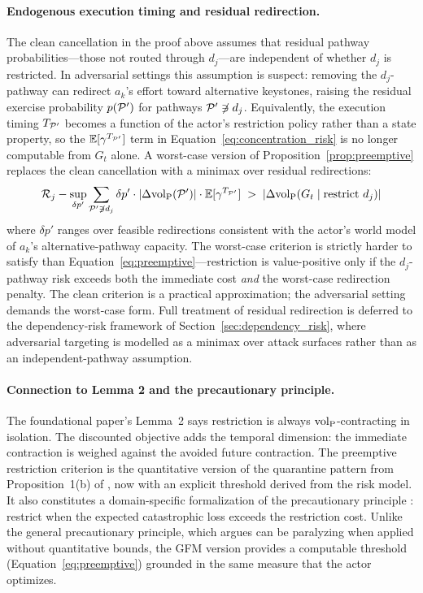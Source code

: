 \paragraph{Endogenous execution timing and residual redirection.} The
clean cancellation in the proof above assumes that residual pathway
probabilities---those not routed through $d_j$---are independent of
whether $d_j$ is restricted. In adversarial settings this assumption is
suspect: removing the $d_j$-pathway can redirect $a_k$'s effort toward
alternative keystones, raising the residual exercise probability
$p(\mathcal{P}')$ for pathways $\mathcal{P}' \not\ni d_j$. Equivalently, the
execution timing $T_{\mathcal{P}'}$ becomes a function of the actor's
restriction policy rather than a state property, so the
$\mathbb{E}[\gamma^{T_{\mathcal{P}'}}]$ term in
Equation~\eqref{eq:concentration_risk} is no longer computable from
$G_t$ alone. A worst-case version of
Proposition~\ref{prop:preemptive} replaces
the clean cancellation with a minimax over residual redirections:
\begin{equation}
\label{eq:preemptive_worst_case}
\mathcal{R}_j - \sup_{\delta p'} \sum_{\mathcal{P}' \not\ni d_j} \delta p'
    \cdot |\Delta {\operatorname{vol}_{\mathrm{P}}}(\mathcal{P}')| \cdot
    \mathbb{E}[\gamma^{T_{\mathcal{P}'}}]
    \;>\; |\Delta {\operatorname{vol}_{\mathrm{P}}}(G_t \mid \text{restrict } d_j)|
\end{equation}
where $\delta p'$ ranges over feasible redirections consistent with the
actor's world model of $a_k$'s alternative-pathway capacity. The
worst-case criterion is strictly harder to satisfy than
Equation~\eqref{eq:preemptive}---restriction is value-positive only if
the $d_j$-pathway risk exceeds both the immediate cost
\emph{and} the worst-case redirection penalty. The clean criterion is a
practical approximation; the adversarial setting demands the
worst-case form. Full treatment of residual redirection is deferred to
the dependency-risk framework of
Section~\ref{sec:dependency_risk}, where adversarial targeting is
modelled as a minimax over attack surfaces rather than as an
independent-pathway assumption.

\paragraph{Connection to Lemma 2 and the precautionary principle.} The
foundational paper's Lemma~2 says restriction is always
${\operatorname{vol}_{\mathrm{P}}}$-contracting in isolation. The discounted objective adds the temporal
dimension: the immediate contraction is weighed against the avoided future
contraction. The preemptive restriction criterion is the quantitative
version of the quarantine pattern from Proposition~1(b) of
\citet{lasser2026gfm}, now with an explicit threshold derived from the risk
model. It also constitutes a domain-specific formalization of the
precautionary principle \citep{taleb2014precautionary}: restrict when the
expected catastrophic loss exceeds the restriction cost. Unlike the general
precautionary principle, which \citet{sunstein2005laws} argues can be
paralyzing when applied without quantitative bounds, the GFM version
provides a computable threshold
(Equation~\eqref{eq:preemptive}) grounded in the same measure that the
actor optimizes.

